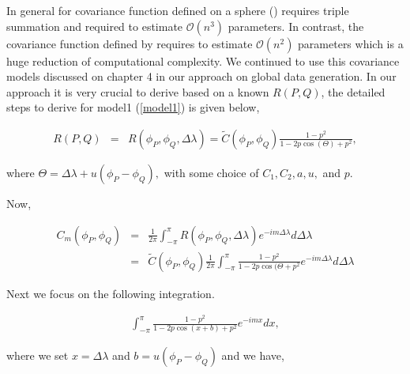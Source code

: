
%
%

In general for covariance function defined on a sphere (\cite{Stein2007}) requires triple summation and required to estimate $\mathcal{O}(n^3)$ parameters. In contrast, the covariance function  defined by \cite{Huang2012} requires to estimate $\mathcal{O}(n^2)$ parameters which is a huge reduction of computational complexity. We continued to use this covariance models discussed on chapter 4 in our approach on global data generation. In our approach it is very crucial to derive \Cm based on a known $R(P,Q)$, the detailed steps to derive \Cm for model1 (\ref{model1}) is given below,


\begin{eqnarray*}
	R(P, Q) &=& R(\phi_P, \phi_Q, \Delta \lambda) = \tilde{C}(\phi_P, \phi_Q) \frac{1-p^2}{1 - 2p \cos(\Theta)+p^2},
\end{eqnarray*}

where $\Theta = \Delta \lambda + u(\phi_P - \phi_Q),$ with some choice of $C_1, C_2, a, u,$ and $p$.

Now,

\begin{eqnarray*}
	C_m(\phi_P, \phi_Q) &=& \frac{1}{2\pi} \int_{-\pi}^\pi R(\phi_P, \phi_Q, \Delta \lambda) e^{-im\Delta \lambda}d\Delta \lambda \\
	&=& \tilde{C}(\phi_P, \phi_Q) \frac{1}{2\pi}\int_{-\pi}^\pi \frac{1-p^2}{1 - 2p \cos(\Theta+p^2} e^{-im\Delta \lambda}d\Delta \lambda
\end{eqnarray*}

Next we focus on the following integration.

\begin{eqnarray*}
	\int_{-\pi}^\pi \frac{1-p^2}{1 - 2p \cos(x+b)+p^2} e^{-imx}dx ,
\end{eqnarray*}

where we set $x=\Delta\lambda$ and $b=u(\phi_P -\phi_Q)$ and we have,

